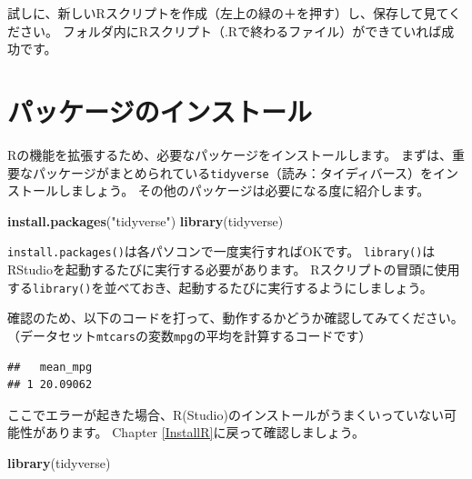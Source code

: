 \documentclass[]{book}
\newenvironment{Shaded}{\begin{snugshade}}{\end{snugshade}}
\newcommand{\KeywordTok}[1]{\textcolor[rgb]{0.13,0.29,0.53}{\textbf{#1}}}
\newcommand{\DataTypeTok}[1]{\textcolor[rgb]{0.13,0.29,0.53}{#1}}
\newcommand{\StringTok}[1]{\textcolor[rgb]{0.31,0.60,0.02}{#1}}
\newcommand{\OperatorTok}[1]{\textcolor[rgb]{0.81,0.36,0.00}{\textbf{#1}}}
\newcommand{\NormalTok}[1]{#1}
\begin{document}
試しに、新しいRスクリプトを作成（左上の緑の＋を押す）し、保存して見てください。
フォルダ内にRスクリプト（.Rで終わるファイル）ができていれば成功です。

\chapter{パッケージのインストール}\label{Packages}

Rの機能を拡張するため、必要なパッケージをインストールします。
まずは、重要なパッケージがまとめられている\texttt{tidyverse}（読み：タイディバース）をインストールしましょう。
その他のパッケージは必要になる度に紹介します。

\begin{Shaded}
\begin{Highlighting}[]
\KeywordTok{install.packages}\NormalTok{(}\StringTok{"tidyverse"}\NormalTok{)}
\KeywordTok{library}\NormalTok{(tidyverse)}
\end{Highlighting}
\end{Shaded}

\texttt{install.packages()}は各パソコンで一度実行すればOKです。
\texttt{library()}はRStudioを起動するたびに実行する必要があります。
Rスクリプトの冒頭に使用する\texttt{library()}を並べておき、起動するたびに実行するようにしましょう。

確認のため、以下のコードを打って、動作するかどうか確認してみてください。
（データセット\texttt{mtcars}の変数\texttt{mpg}の平均を計算するコードです）

\begin{Shaded}
\end{Shaded}

\begin{verbatim}
##   mean_mpg
## 1 20.09062
\end{verbatim}

ここでエラーが起きた場合、R(Studio)のインストールがうまくいっていない可能性があります。
Chapter \ref{InstallR}に戻って確認しましょう。

\begin{Shaded}
\begin{Highlighting}[]
\KeywordTok{library}\NormalTok{(tidyverse)}
\end{Highlighting}
\end{Shaded}
\end{document}
